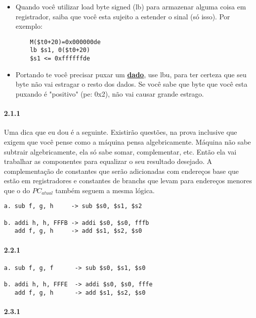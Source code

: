 \documentclass{article}
\begin{document}
\begin{itemize}
\item Quando você utilizar load byte signed (lb) para armazenar alguma coisa em
registrador, saiba que você esta sujeito a estender o sinal (só isso). Por
exemplo:

  \begin{verbatim}
    M($t0+20)=0x000000de
    lb $s1, 0($t0+20)
    $s1 <= 0xffffffde
  \end{verbatim}

\item Portando te você precisar puxar um \textbf{\color{Red} \underline{dado}},
use lbu, para ter certeza que seu byte não vai estragar o resto dos dados. Se
você sabe que byte que você esta puxando é "positivo" (pe: 0x2), não vai causar
grande estrago.

\end{itemize}

\paragraph{2.1.1}

Uma dica que eu dou é a seguinte. Existirão questões, na prova inclusive que
exigem que você pense como a máquina pensa algebricamente. Máquina não sabe
subtrair algebricamente, ela só sabe somar, complementar, etc. Então ela vai
trabalhar as componentes para equalizar o seu resultado desejado. A
complementação de constantes que serão adicionadas com endereços base que estão
em registradores e constantes de branchs que levam para endereços menores que o
do $PC_{atual}$ também seguem a mesma lógica.

\begin{verbatim}
a. sub f, g, h     -> sub $s0, $s1, $s2

b. addi h, h, FFFB -> addi $s0, $s0, fffb
   add f, g, h     -> add $s1, $s2, $s0
\end{verbatim}


\paragraph{2.2.1}

\begin{verbatim}
a. sub f, g, f      -> sub $s0, $s1, $s0

b. addi h, h, FFFE  -> addi $s0, $s0, fffe
   add f, g, h      -> add $s1, $s2, $s0
\end{verbatim}

\paragraph{2.3.1}
\end{document}
